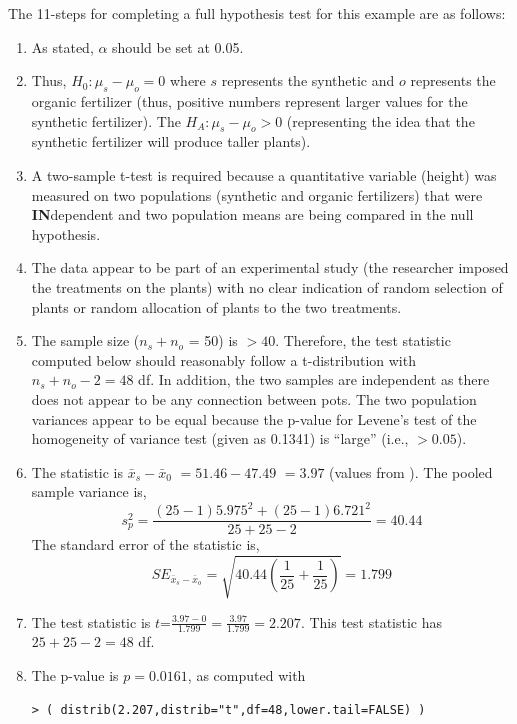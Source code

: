\documentclass[10pt,openany]{book}\usepackage[]{graphicx}\usepackage[]{color}
\makeatletter
\newenvironment{kframe}{%
 \def\at@end@of@kframe{}%
 \ifinner\ifhmode%
  \def\at@end@of@kframe{\end{minipage}}%
  \begin{minipage}{\columnwidth}%
 \fi\fi%
 \def\FrameCommand##1{\hskip\@totalleftmargin \hskip-\fboxsep
 \colorbox{shadecolor}{##1}\hskip-\fboxsep
     \hskip-\linewidth \hskip-\@totalleftmargin \hskip\columnwidth}%
 \MakeFramed {\advance\hsize-\width
   \@totalleftmargin\z@ \linewidth\hsize
   \@setminipage}}%
 {\par\unskip\endMakeFramed%
 \at@end@of@kframe}
\newenvironment{knitrout}{}{} %
\makeatother
\begin{document}
The 11-steps  for completing a full hypothesis test for this example are as follows:
  \begin{enumerate}
    \item As stated, $\alpha$ should be set at 0.05.
    \item Thus, $H_{0}:\mu_{s}-\mu_{o}=0$ where $s$ represents the synthetic and $o$ represents the organic fertilizer (thus, positive numbers represent larger values for the synthetic fertilizer).  The $H_{A}:\mu_{s}-\mu_{o}>0$ (representing the idea that the synthetic fertilizer will produce taller plants).
    \item A two-sample t-test is required because a quantitative variable (height) was measured on two populations (synthetic and organic fertilizers) that were \textbf{IN}dependent and two population means are being compared in the null hypothesis.
    \item The data appear to be part of an experimental study (the researcher imposed the treatments on the plants) with no clear indication of random selection of plants or random allocation of plants to the two treatments.
    \item The sample size ($n_{s}+n_{o}$ = 50) is $>40$.  Therefore, the test statistic computed below should reasonably follow a t-distribution with $n_{s}+n_{o}-2=48$ df.  In addition, the two samples are independent as there does not appear to be any connection between pots.  The two population variances appear to be equal because the p-value for Levene's test of the homogeneity of variance test (given as 0.1341) is ``large'' (i.e., $>0.05$).
    \item The statistic is $\bar{x}_{s}-\bar{x}_{0}$ $= 51.46-47.49$ $= 3.97$ (values from ).  The pooled sample variance is,
    \[s_{p}^{2}=\frac{(25-1)5.975^{2}+(25-1)6.721^{2}}{25+25-2} = 40.44 \]
The standard error of the statistic is,
    \[ SE_{\bar{x}_{s}-\bar{x}_{o}}=\sqrt{40.44\left(\frac{1}{25}+\frac{1}{25} \right)} = 1.799  \]
    \item The test statistic is $t$=$\frac{3.97-0}{1.799} = \frac{3.97}{1.799} = 2.207$.  This test statistic has $25+25-2=48$ df.
    \item The p-value is $p=0.0161$, as computed with
\begin{knitrout}
\color{fgcolor}\begin{kframe}
\begin{verbatim}
> ( distrib(2.207,distrib="t",df=48,lower.tail=FALSE) )

\end{verbatim}
\end{kframe}
\end{knitrout}
\end{enumerate}
\end{document}
